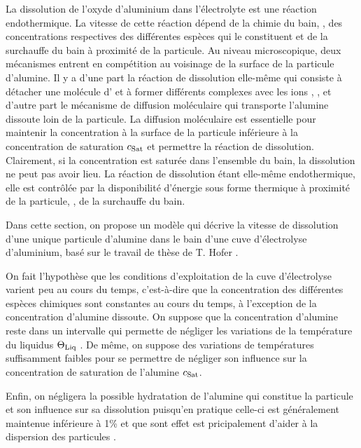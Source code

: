 La dissolution de l'oxyde d'aluminium dans l'électrolyte est une réaction
endothermique. La vitesse de cette réaction dépend de la chimie du
bain, \ie, des concentrations respectives des différentes espèces qui
le constituent et de la surchauffe du bain à proximité de la
particule. Au niveau microscopique, deux mécanismes entrent en
compétition au voisinage de la surface de la particule d'alumine. Il y a
d'une part la réaction de dissolution elle-même qui consiste à
détacher une molécule d' et à former différents complexes
avec les ions  \cite{Haupin1995}, \cite{Kvande1986}, et
d'autre part le mécanisme de diffusion moléculaire qui transporte
l'alumine dissoute loin de la particule. La diffusion moléculaire est
essentielle pour maintenir la concentration à la surface de la
particule inférieure à la concentration de saturation $c_\text{Sat}$ et
permettre la réaction de dissolution. Clairement, si la concentration
est saturée dans l'ensemble du bain, la dissolution ne peut pas avoir
lieu. La réaction de dissolution étant elle-même endothermique, elle
est contrôlée par la disponibilité d'énergie sous forme thermique à
proximité de la particule, \ie, de la surchauffe du bain.

Dans cette section, on propose un modèle qui décrive la vitesse de
dissolution d'une unique particule d'alumine dans le bain d'une cuve
d'électrolyse d'aluminium, basé sur le travail de thèse de T. Hofer
\cite{Hofer2011}.

On fait l'hypothèse que les conditions d'exploitation de la cuve
d'électrolyse varient peu au cours du temps, c'est-à-dire que la
concentration des différentes espèces chimiques sont constantes au
cours du temps, à l'exception de la concentration d'alumine dissoute. On
suppose que la concentration d'alumine reste dans un intervalle qui
permette de négliger les variations de la température du liquidus
$\Theta_\text{Liq}$ \cite{Skybakmoen1997}. De même, on suppose des variations de températures
suffisamment faibles pour se permettre de négliger son influence sur
la concentration de saturation de l'alumine $c_\text{Sat}$.

Enfin, on négligera la possible hydratation de l'alumine qui constitue
la particule et son influence sur sa dissolution puisqu'en pratique
celle-ci est généralement maintenue inférieure à \num{1}\% et que sont
effet est pricipalement d'aider à la dispersion des particules
\cite{Fini2017}.


